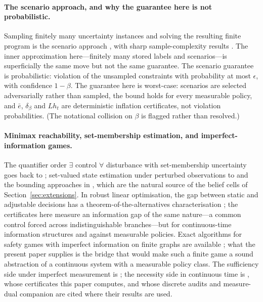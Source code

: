 \documentclass[11pt,a4paper]{article}
\theoremstyle{plain}
\theoremstyle{definition}
\theoremstyle{remark}
\newcommand{\ebar}{\bar{e}}
\begin{document}
\paragraph{The scenario approach, and why the guarantee here is not probabilistic.}
Sampling finitely many uncertainty instances and solving the resulting finite program is the scenario approach \cite{CalafioreCampi2005,CalafioreCampi2006}, with sharp sample-complexity results \cite{CampiGaratti2008,CampiGaratti2011,CampiGarattiPrandini2009}. The inner approximation here---finitely many stored labels and scenarios---is superficially the same move but not the same guarantee. The scenario guarantee is probabilistic: violation of the unsampled constraints with probability at most $\epsilon$, with confidence $1-\beta$. The guarantee here is worst-case: scenarios are selected adversarially rather than sampled, the bound holds for every measurable policy, and $\ebar$, $\delta_\beta$ and $Lh_t$ are deterministic inflation certificates, not violation probabilities. (The notational collision on $\beta$ is flagged rather than resolved.)

\paragraph{Minimax reachability, set-membership estimation, and imperfect-information games.}
The quantifier order $\exists$ control $\forall$ disturbance with set-membership uncertainty goes back to \cite{BertsekasRhodes1971}; set-valued state estimation under perturbed observations to \cite{Witsenhausen1968} and the bounding approaches in \cite{Milanese1996}, which are the natural source of the belief cells of Section~\ref{sec:extensions}. In robust linear optimisation, the gap between static and adjustable decisions has a theorem-of-the-alternatives characterisation \cite{WeiZhang2024}; the certificates here measure an information gap of the same nature---a common control forced across indistinguishable branches---but for continuous-time information structures and against measurable policies. Exact algorithms for safety games with imperfect information on finite graphs are available \cite{Chatterjee2007}; what the present paper supplies is the bridge that would make such a finite game a sound abstraction of a continuous system with a measurable policy class. The sufficiency side under imperfect measurement is \cite{Veliov1993}; the necessity side in continuous time is \cite{Abaee2026calc}, whose certificates this paper computes, and whose discrete audits \cite{Abaee2026worked} and measure-dual companion \cite{Abaee2026minimax} are cited where their results are used.
\end{document}
